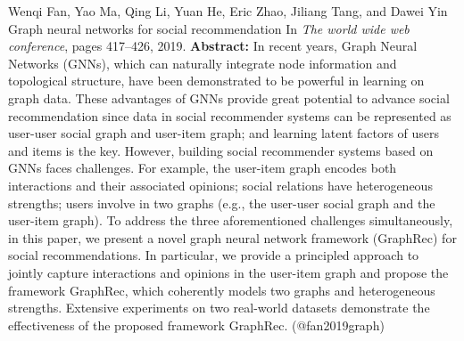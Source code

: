 \documentclass{article}
\begin{document}
\begin{thebibliography}{}
 Wenqi Fan, Yao Ma, Qing Li, Yuan He, Eric Zhao, Jiliang Tang, and Dawei Yin \newblock Graph neural networks for social recommendation \newblock In {\em The world wide web conference}, pages 417--426, 2019. \newblock \textbf{Abstract:} In recent years, Graph Neural Networks (GNNs), which can naturally integrate node information and topological structure, have been demonstrated to be powerful in learning on graph data. These advantages of GNNs provide great potential to advance social recommendation since data in social recommender systems can be represented as user-user social graph and user-item graph; and learning latent factors of users and items is the key. However, building social recommender systems based on GNNs faces challenges. For example, the user-item graph encodes both interactions and their associated opinions; social relations have heterogeneous strengths; users involve in two graphs (e.g., the user-user social graph and the user-item graph). To address the three aforementioned challenges simultaneously, in this paper, we present a novel graph neural network framework (GraphRec) for social recommendations. In particular, we provide a principled approach to jointly capture interactions and opinions in the user-item graph and propose the framework GraphRec, which coherently models two graphs and heterogeneous strengths. Extensive experiments on two real-world datasets demonstrate the effectiveness of the proposed framework GraphRec. \newblock (@fan2019graph)


\end{thebibliography}
\end{document}
